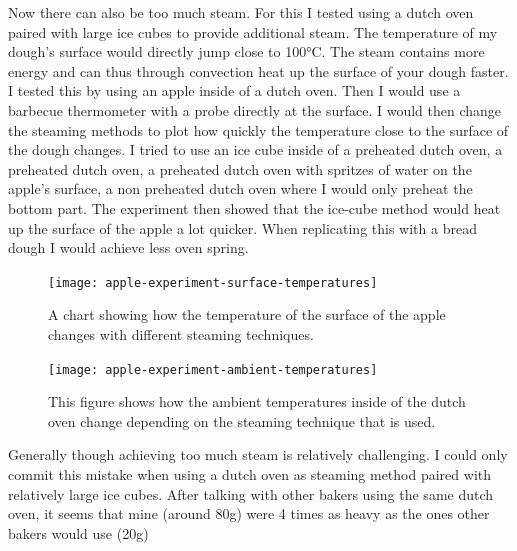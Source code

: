 Now there can also be too much steam. For this I tested using a dutch oven paired with large ice
cubes to provide additional steam. The temperature of my dough's surface would directly
jump close to 100°C. The steam contains more energy and can thus through convection
heat up the surface of your dough faster. I tested this by using an apple inside of
a dutch oven. Then I would use a barbecue thermometer with a probe directly at the surface.
I would then change the steaming methods to plot how quickly the temperature
close to the surface of the dough changes. I tried to use an ice cube inside of a preheated
dutch oven, a preheated dutch oven, a preheated dutch oven with spritzes
of water on the apple's surface, a non preheated dutch oven where I would only preheat
the bottom part. The experiment then showed that the ice-cube method would heat up
the surface of the apple a lot quicker. When replicating this with a bread dough
I would achieve less oven spring.

\begin{figure}[h]
  \texttt{[image: apple-experiment-surface-temperatures]}
  \caption{A chart showing how the temperature of the surface
  of the apple changes with different steaming techniques.}
  \label{apple-experiment-surface-temperatures}
\end{figure}

\begin{figure}[h]
  \texttt{[image: apple-experiment-ambient-temperatures]}
  \caption{This figure shows how the ambient temperatures inside of the
  dutch oven change depending on the steaming technique that is used.}
  \label{apple-experiment-ambient-temperatures}
\end{figure}

Generally though achieving too much steam is relatively challenging. I could only
commit this mistake when using a dutch oven as steaming method paired with relatively
large ice cubes. After talking with other bakers using the same dutch oven, it seems
that mine (around 80g) were 4 times as heavy as the ones other bakers would use (20g)